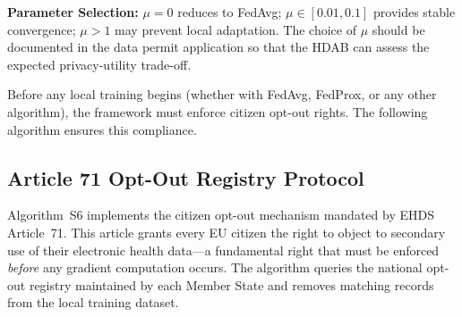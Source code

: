 \documentclass[conference,a4paper]{IEEEtran}
\begin{document}
\begin{figure}[htbp]
\centering
{}
\end{figure}

\textbf{Parameter Selection:} $\mu = 0$ reduces to FedAvg; $\mu \in [0.01, 0.1]$ provides stable convergence; $\mu > 1$ may prevent local adaptation. The choice of $\mu$ should be documented in the data permit application so that the HDAB can assess the expected privacy-utility trade-off.

Before any local training begins (whether with FedAvg, FedProx, or any other algorithm), the framework must enforce citizen opt-out rights. The following algorithm ensures this compliance.

\subsection{Article 71 Opt-Out Registry Protocol}

Algorithm~S6 implements the citizen opt-out mechanism mandated by EHDS Article~71. This article grants every EU citizen the right to object to secondary use of their electronic health data---a fundamental right that must be enforced \textit{before} any gradient computation occurs. The algorithm queries the national opt-out registry maintained by each Member State and removes matching records from the local training dataset.
\end{document}
